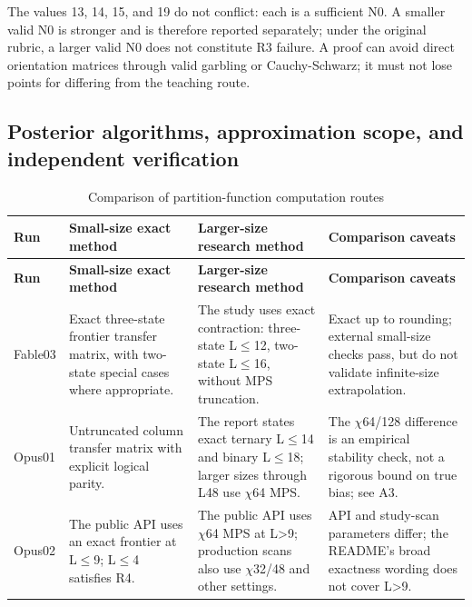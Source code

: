 \documentclass[11pt,a4paper]{article}
\begin{document}
The values 13,\allowbreak{} 14,\allowbreak{} 15,\allowbreak{} and 19 do not conflict: each is a sufficient N0. A smaller valid N0 is stronger and is therefore reported separately; under the original rubric,\allowbreak{} a larger valid N0 does not constitute R3 failure. A proof can avoid direct orientation matrices through valid garbling or Cauchy-Schwarz; it must not lose points for differing from the teaching route.

\clearpage
\subsection{Posterior algorithms,\allowbreak{} approximation scope,\allowbreak{} and independent verification}
{\fontsize{9.0}{12.6}\selectfont
\setlength{\tabcolsep}{2.5pt}
\begin{longtable}{>{\raggedright\arraybackslash}p{}>{\raggedright\arraybackslash}p{}>{\raggedright\arraybackslash}p{}>{\raggedright\arraybackslash}p{}}
\caption{Comparison of partition-function computation routes}\\
\toprule
\textbf{Run} & \textbf{Small-size exact method} & \textbf{Larger-size research method} & \textbf{Comparison caveats}\tabularnewline
\midrule
\endfirsthead
\toprule
\textbf{Run} & \textbf{Small-size exact method} & \textbf{Larger-size research method} & \textbf{Comparison caveats}\tabularnewline
\midrule
\endhead
{}Fable03 & Exact three-state frontier transfer matrix,\allowbreak{} with two-state special cases where appropriate. & The study uses exact contraction: three-state L\ensuremath{\leq}12,\allowbreak{} two-state L\ensuremath{\leq}16,\allowbreak{} without MPS truncation. & Exact up to rounding; external small-size checks pass,\allowbreak{} but do not validate infinite-size extrapolation.\tabularnewline
{}Opus01 & Untruncated column transfer matrix with explicit logical parity. & The report states exact ternary L\ensuremath{\leq}14 and binary L\ensuremath{\leq}18; larger sizes through L48 use \ensuremath{\chi}64 MPS. & The \ensuremath{\chi}64/\allowbreak{}128 difference is an empirical stability check,\allowbreak{} not a rigorous bound on true bias; see A3.\tabularnewline
{}Opus02 & The public API uses an exact frontier at L\ensuremath{\leq}9; L\ensuremath{\leq}4 satisfies R4. & The public API uses \ensuremath{\chi}64 MPS at L>9; production scans also use \ensuremath{\chi}32/\allowbreak{}48 and other settings. & API and study-scan parameters differ; the README's broad exactness wording does not cover L>9.\tabularnewline

\end{longtable}}
\end{document}
